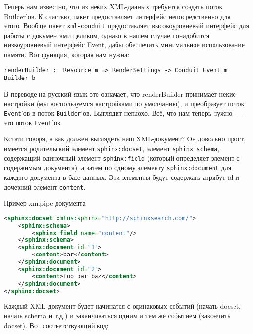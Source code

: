 Теперь нам известно, что из неких XML-данных требуется создать поток Builder'ов. К счастью, пакет  предоставляет интерфейс непосредственно для этого. Вообще пакет \lstinline'xml-conduit' предоставляет высокоуровневый интерфейс для работы с документами целиком, однако в нашем случае понадобится низкоуровневый интерфейс Event, дабы обеспечить минимальное использование памяти. Вот функция, которая нам нужна:

\begin{lstlisting}
renderBuilder :: Resource m => RenderSettings -> Conduit Event m Builder b
\end{lstlisting}

В переводе на русский язык это означает, что renderBuilder принимает некие настройки (мы воспользуемся настройками по умолчанию), и преобразует поток \lstinline!Event!'ов в поток \lstinline!Builder!'ов. Выглядит неплохо. Всё, что нам теперь нужно~--- это поток \lstinline!Event!'ов.

Кстати говоря, а как должен выглядеть наш XML-документ? Он довольно прост, имеется родительский элемент \lstinline'sphinx:docset', элемент \lstinline'sphinx:schema', содержащий одиночный элемент \lstinline'sphinx:field' (который определяет элемент с содержимым документа), а затем по одному элементу \lstinline'sphinx:document' для каждого документа в базе данных. Эти элементы будут содержать атрибут id и дочерний элемент \lstinline'content'.

\begin{remark}
Пример xmlpipe-документа %
\begin{lstlisting}[language=XML]
<sphinx:docset xmlns:sphinx="http://sphinxsearch.com/">
    <sphinx:schema>
        <sphinx:field name="content"/>
    </sphinx:schema>
    <sphinx:document id="1">
        <content>bar</content>
    </sphinx:document>
    <sphinx:document id="2">
        <content>foo bar baz</content>
    </sphinx:document>
</sphinx:docset>
\end{lstlisting}
\end{remark}

Каждый XML-документ будет начинатся с одинаковых событий (начать docset, начать schema и т.д.) и заканчиваться одним и тем же событием (закончить docset). Вот соответствующий код: %

